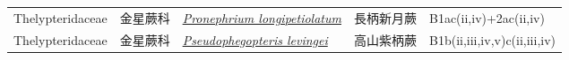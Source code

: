 {\begin{longtable}{p{2.5cm}p{2.5cm}p{4.5cm}p{2.5cm}p{3cm}}
    Thelypteridaceae & 金星蕨科 & \href{http://www.theplantlist.org/tpl1.1/search?q=Pronephrium+longipetiolatum}{\textit{Pronephrium longipetiolatum} } & 長柄新月蕨 & B1ac(ii,iv)+2ac(ii,iv) \index{Pronephrium@\textit{Pronephrium}!longipetiolatum@\textit{longipetiolatum}}  \index{長柄新月蕨} \\
    Thelypteridaceae & 金星蕨科 & \href{http://www.theplantlist.org/tpl1.1/search?q=Pseudophegopteris+levingei}{\textit{Pseudophegopteris levingei} } & 高山紫柄蕨 & B1b(ii,iii,iv,v)c(ii,iii,iv) \index{Pseudophegopteris@\textit{Pseudophegopteris}!levingei@\textit{levingei}}  \index{高山紫柄蕨} \\
    \bottomrule
        \end{longtable}
        }
    